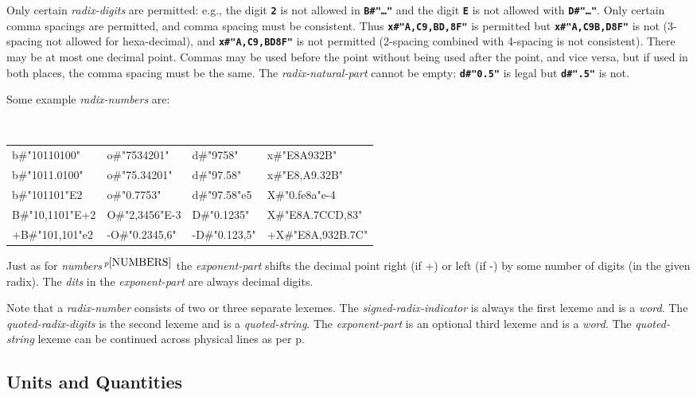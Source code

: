 \documentclass[12pt]{article}
\newcommand{\TT}[1]{{\tt \bfseries #1}}
\newcommand{\pagref}[1]{p\pageref{#1}}
\newcommand{\pagnote}[1]{$\,^{p\pageref{#1}}$}
\newenvironment{indpar}[1][0.3in]%
	{\begin{list}{}%
		     {\setlength{\itemsep}{0in}%
		      \setlength{\topsep}{0in}%
		      \setlength{\parsep}{1ex}%
		      \setlength{\labelwidth}{#1}%
		      \setlength{\leftmargin}{#1}%
		      \addtolength{\leftmargin}{\labelsep}}%
	 \item}%
	{\end{list}}
\begin{document}
Only certain {\em radix-digits} are permitted: e.g., the digit \TT{2}
is not allowed in \TT{B\#"\ldots"} and the digit \TT{E} is not allowed
with \TT{D\#"\ldots"}.  Only certain comma spacings are permitted, and comma
spacing must be consistent.  Thus \TT{x\#"A,C9,BD,8F"} is permitted but
\TT{x\#"A,C9B,D8F"} is not (3-spacing not allowed for hexa-decimal),
and \TT{x\#"A,C9,BD8F"} is not permitted (2-spacing combined with
4-spacing is not consistent).
There may be at most one decimal point.
Commas may be used before the point without being used after the
point, and vice versa, but if used in both places, the comma spacing
must be the same.  The {\em radix-natural-part}
cannot be empty: \TT{d\#"0.5"} is legal but \TT{d\#".5"} is not.

Some example {\em radix-numbers} are:

\begin{indpar}[0.1in]
\tt
\begin{tabular}{@{}l@{~~}l@{~~}l@{~~}l@{}}
b\#"10110100"	& o\#"7534201"   & d\#"9758"	& x\#"E8A932B" \\
b\#"1011.0100"	& o\#"75.34201"  & d\#"97.58"	& x\#"E8,A9.32B" \\
b\#"101101"E2	& o\#"0.7753"    & d\#"97.58"e5	& X\#"0.fe8a"e-4 \\
B\#"10,1101"E+2	& O\#"2,3456"E-3 & D\#"0.1235"	& X\#"E8A.7CCD,83" \\
+B\#"101,101"e2	& -O\#"0.2345,6" & -D\#"0.123,5" & +X\#"E8A,932B.7C" \\
\end{tabular}
\end{indpar}

Just as for {\em numbers}\pagnote{NUMBERS}
the {\em exponent-part} shifts the decimal point right (if +) or left (if -)
by some number of digits (in the given radix).  The {\em dits}
in the {\em exponent-part} are always decimal digits.

Note that a {\em radix-number} consists of two or three separate
lexemes.  The {\em signed-radix-indicator} is always the first
lexeme and is a {\em word}.  The {\em quoted-radix-digits}
is the second lexeme and is a {\em quoted-string}.  The
{\em exponent-part} is an optional third lexeme and is a {\em word}.
The {\em quoted-string} lexeme can be continued across physical lines
as per \pagref{QUOTED-STRING-CONCATENATION}.

\subsection{Units and Quantities}
\label{UNITS-AND-QUANTITIES}
\end{document}
